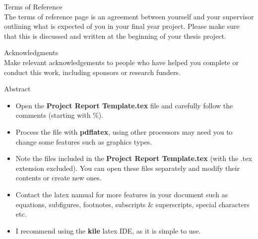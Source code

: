 \documentclass[a4paper,12pt]{report}
\begin{document}
{{\newpage
    {\Huge Terms of Reference}\\
    \vskip 10mm
    The terms of reference page is an agreement between yourself and your supervisor outlining what is expected of you in your final year project. Please make sure that this is discussed and written at the beginning of your thesis project. 


\newpage
{\Huge Acknowledgments}\\
\vskip 10mm
Make relevant acknowledgements to people who have helped you complete or conduct this work, including sponsors or research funders.


\newpage
    {\Huge Abstract}\\
    \vskip 10mm

    \begin{itemize}
        \item Open the {\bf Project Report Template.tex} file and carefully follow the comments (starting with \%).
        \item Process the file with {\bf pdflatex}, using other processors may need you to change some features such as graphics types.
        \item Note the files included in the  {\bf Project Report Template.tex} (with the {.tex} extension excluded). You can open these files separately and modify their contents 
        or create new ones.
        \item Contact the latex namual for more features in your document such as equations, subfigures, footnotes, subscripts \& superscripts, special characters etc.
        \item I recommend using the {\bf kile} latex IDE, as it is simple to use.
    \end{itemize}

    

\newpage
    \tableofcontents



\newpage
\pagestyle{fancy}


\printnoidxglossaries









\appendix



}} %
\end{document}

